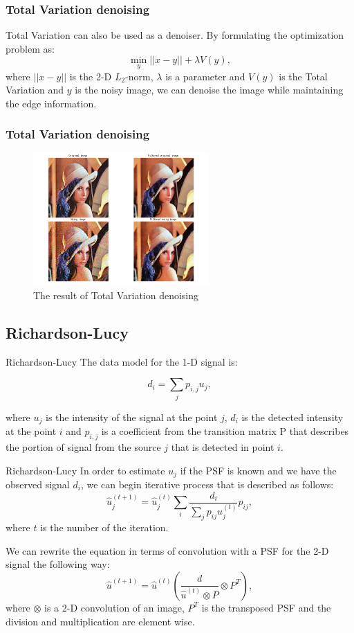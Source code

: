 \documentclass[aspectratio=1610]{beamer}
\begin{document}
\begin{frame}
  \frametitle{Total Variation denoising}
  Total Variation can also be used as a denoiser. By formulating
  the optimization problem as:
  $$
  \min\limits_{y} ||x - y|| + \lambda V(y),
  $$
  where $||x - y||$ is the 2-D $L_2$-norm, $\lambda$ is a parameter 
  and $V(y)$ is the Total Variation and $y$ is the noisy image, we can
  denoise the image while maintaining the edge information.
\end{frame}

\begin{frame}
  \frametitle{Total Variation denoising}
  \begin{figure}
    \centering
    \includegraphics[width=0.6\textwidth]{images/TV_denoising.png}
    \caption{The result of Total Variation denoising}
    \label{fig:TVDenoising}
  \end{figure}
\end{frame}

\subsection {Richardson-Lucy}
\begin{frame}{Richardson-Lucy}
  The data model for the 1-D signal is:
  
  $$
  d_i = \sum\limits_{j}{p_{i, j}u_j},
  $$
  
  where $u_j$ is the intensity of the signal at the point $j$,
  $d_i$ is the detected intensity at the point $i$ and
  $p_{i, j}$ is a coefficient from the transition matrix P
  that describes the portion of signal from the source $j$
  that is detected in point $i$.
\end{frame}

\begin{frame}{Richardson-Lucy}
  In order to estimate $u_j$ if the PSF is known and we have 
  the observed signal $d_i$, we can begin iterative process
  that is described as follows:
  $$
  \hat{u}^{(t+1)}_j = \hat{u}^{(t)}_j\sum\limits_{i}
  \frac{d_i}{\sum\limits_{j}p_{ij}\hat{u}^{(t)}_j}p_{ij},
  $$
  where $t$ is the number of the iteration.
  
  We can rewrite the equation in terms of convolution with a PSF for the
  2-D signal the following way:
  $$
  \hat{u}^{(t+1)}=\hat{u}^{(t)}(\frac{d}{\hat{u}^{(t)} \otimes P} \otimes P^T),
  $$
  where $\otimes$ is a 2-D convolution of an image, $P^T$ is the 
  transposed PSF and the division and multiplication are element wise.
\end{frame}
\end{document}
